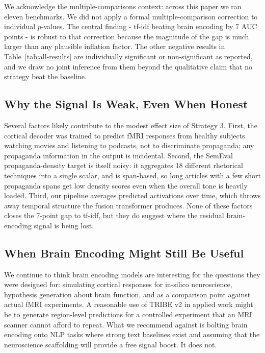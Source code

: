 \documentclass[11pt]{article}
\begin{document}
We acknowledge the multiple-comparisons context: across this paper we ran eleven benchmarks. We did not apply a formal multiple-comparison correction to individual $p$-values. The central finding - tf-idf beating brain encoding by 7 AUC points - is robust to that correction because the magnitude of the gap is much larger than any plausible inflation factor. The other negative results in Table~\ref{tab:all-results} are individually significant or non-significant as reported, and we draw no joint inference from them beyond the qualitative claim that no strategy beat the baseline.

\subsection{Why the Signal Is Weak, Even When Honest}

Several factors likely contribute to the modest effect size of Strategy 3. First, the cortical decoder was trained to predict fMRI responses from healthy subjects watching movies and listening to podcasts, not to discriminate propaganda; any propaganda information in the output is incidental. Second, the SemEval propaganda-density target is itself noisy: it aggregates 18 different rhetorical techniques into a single scalar, and is span-based, so long articles with a few short propaganda spans get low density scores even when the overall tone is heavily loaded. Third, our pipeline averages predicted activations over time, which throws away temporal structure the fusion transformer produces. None of these factors closes the 7-point gap to tf-idf, but they do suggest where the residual brain-encoding signal is being lost.

\subsection{When Brain Encoding Might Still Be Useful}

We continue to think brain encoding models are interesting for the questions they were designed for: simulating cortical responses for in-silico neuroscience, hypothesis generation about brain function, and as a comparison point against actual fMRI experiments. A reasonable use of TRIBE v2 in applied work might be to generate region-level predictions for a controlled experiment that an MRI scanner cannot afford to repeat. What we recommend against is bolting brain encoding onto NLP tasks where strong text baselines exist and assuming that the neuroscience scaffolding will provide a free signal boost. It does not.
\end{document}
